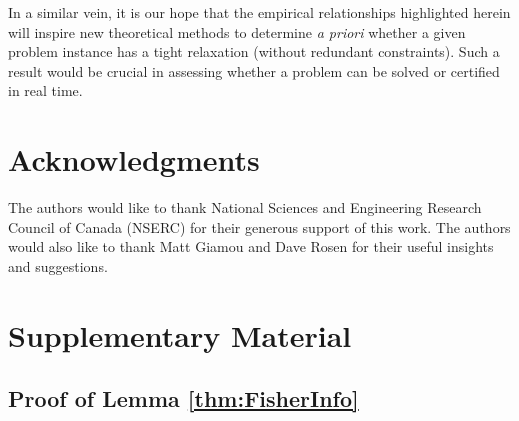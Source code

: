 \documentclass[lettersize,journal]{IEEEtran}
\newcommand{\rev}[1]{\color{red}{#1}\color{black}}
\begin{document}
In a similar vein, it is our hope that the empirical relationships highlighted herein will inspire new theoretical methods to determine \emph{a priori} whether a given problem instance has a tight relaxation (without redundant constraints)\cite{carloneEstimationContractsOutlierRobust2022}. Such a result would be crucial in assessing whether a problem can be solved or certified in real time. 

\section{Acknowledgments}

The authors would like to thank National Sciences and Engineering Research Council of Canada (NSERC) for their generous support of this work. The authors would also like to thank Matt Giamou and Dave Rosen for their useful insights and suggestions.
 



\section{Supplementary Material}

\subsection{Proof of Lemma \ref{thm:FisherInfo}}\label{SM:lemma1Proof}
\end{document}
